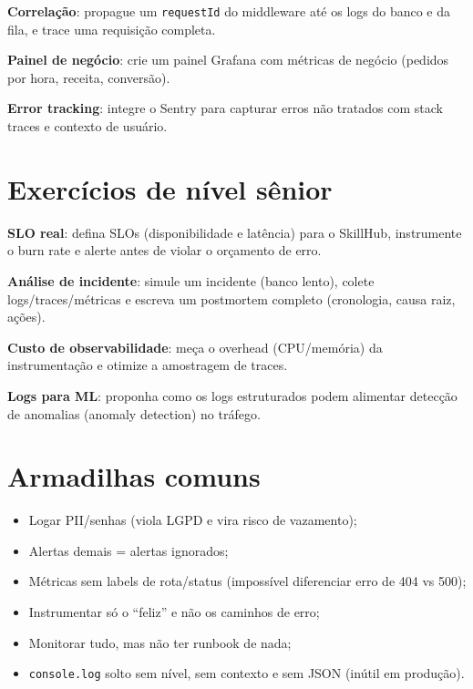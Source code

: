 \begin{desafios}
  \item \textbf{Correlação}: propague um \texttt{requestId} do middleware até os logs do banco e da fila, e trace uma requisição completa.
  \item \textbf{Painel de negócio}: crie um painel Grafana com métricas de negócio (pedidos por hora, receita, conversão).
  \item \textbf{Error tracking}: integre o Sentry para capturar erros não tratados com stack traces e contexto de usuário.
\end{desafios}

\section{Exercícios de nível sênior}

\begin{seniores}
  \item \textbf{SLO real}: defina SLOs (disponibilidade e latência) para o SkillHub, instrumente o burn rate e alerte antes de violar o orçamento de erro.
  \item \textbf{Análise de incidente}: simule um incidente (banco lento), colete logs/traces/métricas e escreva um postmortem completo (cronologia, causa raiz, ações).
  \item \textbf{Custo de observabilidade}: meça o overhead (CPU/memória) da instrumentação e otimize a amostragem de traces.
  \item \textbf{Logs para ML}: proponha como os logs estruturados podem alimentar detecção de anomalias (anomaly detection) no tráfego.
\end{seniores}

\section{Armadilhas comuns}

\begin{itemize}[leftmargin=*, itemsep=0.4em]
  \item Logar PII/senhas (viola LGPD e vira risco de vazamento);
  \item Alertas demais = alertas ignorados;
  \item Métricas sem labels de rota/status (impossível diferenciar erro de 404 vs 500);
  \item Instrumentar só o ``feliz'' e não os caminhos de erro;
  \item Monitorar tudo, mas não ter runbook de nada;
  \item \texttt{console.log} solto sem nível, sem contexto e sem JSON (inútil em produção).
\end{itemize}

